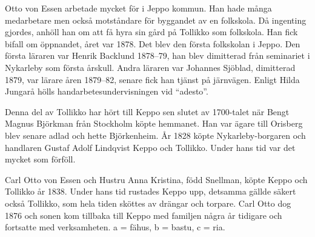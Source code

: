 Otto von Essen arbetade mycket för  i Jeppo kommun. Han hade många medarbetare men också motståndare för byggandet av en folkskola. Då ingenting gjordes, anhöll han om att få hyra sin gård på Tollikko som folkskola. Han fick bifall om öppnandet, året var 1878. Det blev den första folkskolan i Jeppo. Den första läraren var Henrik Backlund 1878--79, han blev dimitterad från seminariet i Nykarleby som första årskull. Andra läraren var Johannes Sjöblad, dimitterad 1879, var lärare åren 1879--82, senare fick han tjänst på järnvägen. Enligt Hilda Jungarå hölls handarbetesundervisningen vid ``adesto''.

Denna del av Tollikko har hört till Keppo sen slutet av 1700-talet när Bengt Magnus Björkman från Stockholm köpte hemmanet. Han var ägare till Orisberg blev senare adlad och hette Björkenheim. År 1828 köpte Nykarleby-borgaren och handlaren Gustaf Adolf Lindqvist Keppo och Tollikko. Under hans tid var det mycket som förföll.


Carl Otto von Essen och Hustru Anna Kristina, född Snellman, köpte Keppo och Tollikko år 1838. Under hans tid rustades Keppo upp, detsamma gällde säkert också Tollikko, som hela tiden sköttes av drängar och torpare. Carl Otto dog 1876 och sonen kom tillbaka till Keppo med familjen några år tidigare och fortsatte med 	verksamheten. a = fähus, b = bastu, c = ria.






